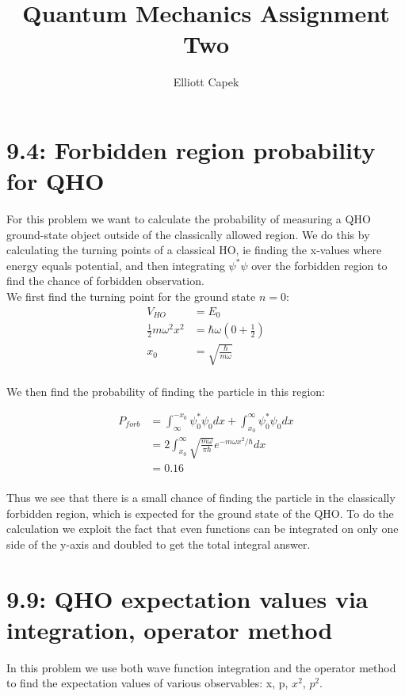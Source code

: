 \documentclass[10pt]{article} %
\title{Quantum Mechanics Assignment Two}
\author{Elliott Capek}
\begin{document}
\maketitle{}

\section{9.4: Forbidden region probability for QHO}
For this problem we want to calculate the probability of measuring a QHO ground-state object outside
of the classically allowed region. We do this by calculating the turning points of a classical HO,
ie finding the x-values where energy equals potential, and then integrating $\psi^*\psi$ over the
forbidden region to find the chance of forbidden observation.\\

We first find the turning point for the ground state $n=0$:
\begin{align*}
  V_{HO} &= E_0\\
  \frac{1}{2}m\omega^2x^2 &= \hbar\omega\left(0+\frac{1}{2}\right)\\
  x_0 &= \sqrt{\frac{\hbar}{m\omega}}\\
\end{align*}

We then find the probability of finding the particle in this region:

\begin{align*}
  P_{forb} &= \int_{\infty}^{-x_0} \psi_0^*\psi_0 dx + \int_{x_0}^{\infty} \psi_0^*\psi_0 dx\\
  &= 2\int_{x_0}^{\infty} \sqrt{\frac{m\omega}{\pi\hbar}}e^{-m\omega x^2 / \hbar} dx\\
  &= 0.16\\
\end{align*}

Thus we see that there is a small chance of finding the particle in the classically
forbidden region, which is expected for the ground state of the QHO. To do the
calculation we exploit the fact that even functions can be integrated on only one
side of the y-axis and doubled to get the total integral answer.\\

\section{9.9: QHO expectation values via integration, operator method}
In this problem we use both wave function integration and the operator method to find the
expectation values of various observables: x, p, $x^2$, $p^2$.
\end{document}
